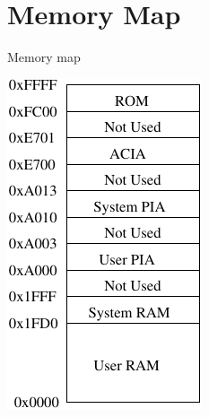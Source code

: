 \section{Memory Map}

\begin{frame}{Memory map}
  \begin{center}
    \includegraphics{6800MemoryModel}
  \end{center}
\end{frame}



